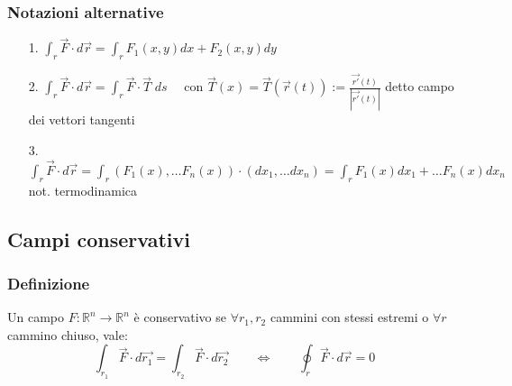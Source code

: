 \documentclass[a4paper]{article}
\newcommand\Rn{\mathbb{R}^n}  %
\begin{document}
\subsubsection*{Notazioni alternative}
\begin{itemize}
	\item[1.] \(\displaystyle \int_r \vec{F} \cdot d\vec{r} = \int_r F_1(x,y) dx + F_2(x,y) dy\)
	\item[2.] \(\displaystyle \int_r \vec{F} \cdot d\vec{r} = \int_r \vec{F} \cdot \vec{T} \; ds \quad\) con \(\displaystyle \vec{T}(x) = \vec{T}(\vec{r}(t)) := \frac{\vec{r'}(t)}{\left|\vec{r'}(t)\right|}\) detto campo dei vettori tangenti
	\item[3.] \(\displaystyle \int_r \vec{F} \cdot d\vec{r} = \int_r (F_1(x), \dots F_n(x)) \cdot (dx_1, \dots dx_n) = \int_r F_1(x)dx_1 + \dots F_n(x) dx_n \quad\) not. termodinamica
\end{itemize}

\subsection{Campi conservativi}
\subsubsection*{Definizione}
Un campo \(F: \Rn \to \Rn\) è conservativo se \(\forall r_1, r_2\) cammini con stessi estremi o \(\forall r\) cammino chiuso, vale:
\[\int_{r_1} \vec{F} \cdot d\vec{r_1} = \int_{r_2} \vec{F} \cdot d\vec{r_2} \qquad \Leftrightarrow \qquad \oint_r \vec{F} \cdot d\vec{r} = 0\]
\end{document}
